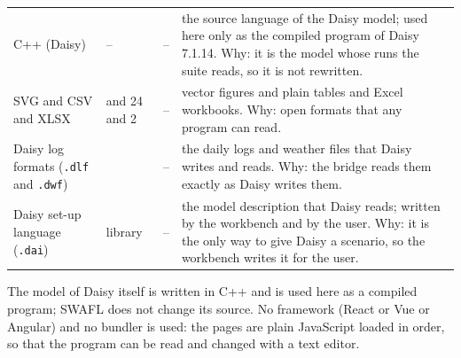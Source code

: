 \begin{table}[H]
\begin{tabular}{@{}>{\raggedright\arraybackslash}p{3.3cm}>{\raggedright\arraybackslash}p{2.0cm}>{\raggedright\arraybackslash}p{2.1cm}>{\raggedright\arraybackslash}p{6.6cm}@{}}
C++ (Daisy) & -- & -- & the source language of the Daisy model; used here only as the compiled program of Daisy 7.1.14. Why: it is the model whose runs the suite reads, so it is not rewritten.\\
SVG and CSV and XLSX & 4 and 24 and 2 & -- & vector figures and plain tables and Excel workbooks. Why: open formats that any program can read.\\
Daisy log formats (\texttt{.dlf} and \texttt{.dwf}) & 29 & -- & the daily logs and weather files that Daisy writes and reads. Why: the bridge reads them exactly as Daisy writes them.\\
Daisy set-up language (\texttt{.dai}) & library & -- & the model description that Daisy reads; written by the workbench and by the user. Why: it is the only way to give Daisy a scenario, so the workbench writes it for the user.\\
\bottomrule\end{tabular}\end{table}
The model of Daisy itself is written in C++ and is used here as a compiled program; SWAFL does not change its source. No framework (React or Vue or Angular) and no bundler is used: the pages are plain JavaScript loaded in order, so that the program can be read and changed with a text editor.

